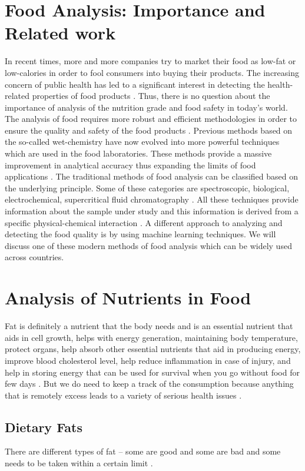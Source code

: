 \documentclass[sigconf]{acmart}
\begin{document}
\section{Food Analysis: Importance and Related work}
In recent times, more and more companies try to market their food as low-fat or low-calories in order to fool consumers into buying their products. The increasing concern of public health has led to a significant interest in detecting the health-related properties of food products  \cite{cifuentes2012food}. Thus, there is no question about the importance of analysis of the nutrition grade and food safety in today's world. The analysis of food requires more robust and efficient methodologies in order to ensure the quality and safety of the food products \cite{cifuentes2012food}. Previous methods based on the so-called wet-chemistry have now evolved into more powerful techniques which are used in the food laboratories. These methods provide a massive improvement in analytical accuracy thus expanding the limits of food applications \cite{cifuentes2012food}. The traditional methods of food analysis can be classified based on the underlying principle. Some of these categories are spectroscopic, biological, electrochemical, supercritical fluid chromatography \cite{cifuentes2012food}. All these techniques provide information about the sample under study and this information is derived from a specific physical-chemical interaction \cite{cifuentes2012food}. A different approach to analyzing and detecting the food quality is by using machine learning techniques. We will discuss one of these modern methods of food analysis which can be widely used across countries.


\section{Analysis of Nutrients in Food}
Fat is definitely a nutrient that the body needs and is an essential nutrient that aids in cell growth, helps with energy generation, maintaining body temperature, protect organs, help absorb other essential nutrients that aid in producing energy, improve blood cholesterol level, help reduce inflammation in case of injury, and help in storing energy that can be used for survival when you go without food for few days \cite{www-health}. But we do need to keep a track of the consumption because anything that is remotely excess leads to a variety of serious health issues \cite{www-health}.  

\subsection{Dietary Fats}
There are different types of fat – some are good and some are bad and some needs to be taken within a certain limit \cite{www-health}. 
\end{document}

